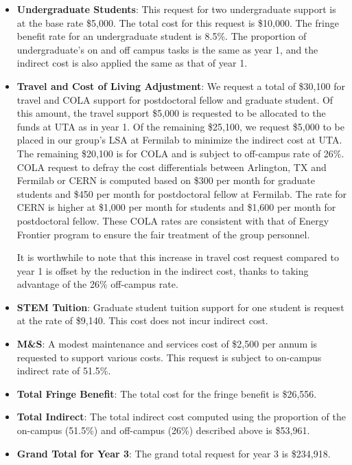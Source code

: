 \begin{enumerate}
\begin{itemize}[noitemsep,nolistsep]
\item {{\bf Undergraduate Students}: This request for two undergraduate support is at the base rate \$5,000.  The total cost for this request is \$10,000.  The fringe benefit rate for an undergraduate student is 8.5\%.  The proportion of undergraduate’s on and off campus tasks is the same as year 1, and the indirect cost is also applied the same as that of year 1.}

\item{{\bf Travel and Cost of Living Adjustment}: We request a total of \$30,100 for travel and COLA support for postdoctoral fellow and graduate student.   Of this amount, the travel support \$5,000 is requested to be allocated to the funds at UTA as in year 1.  Of the remaining \$25,100, we request \$5,000 to be placed in our group’s LSA at Fermilab to minimize the indirect cost at UTA.   The remaining \$20,100 is for COLA and is subject to off-campus rate of 26\%.  COLA request to defray the cost differentials between Arlington, TX and Fermilab or CERN is computed based on \$300 per month for graduate students and \$450 per month for postdoctoral fellow at Fermilab.  The rate for CERN is higher at \$1,000 per month for students and \$1,600 per month for postdoctoral fellow.  These COLA rates are consistent with that of Energy Frontier program to ensure the fair treatment of the group personnel.  

It is worthwhile to note that this increase in travel cost request compared to year 1 is offset by the reduction in the indirect cost, thanks to taking advantage of the 26\% off-campus rate.}

\item {{\bf STEM Tuition}: Graduate student tuition support for one student is request at the rate of \$9,140.  This cost does not incur indirect cost.}

\item {{\bf M\&S}: A modest maintenance and services cost of \$2,500 per annum is requested to support various costs.   This request is subject to on-campus indirect rate of 51.5\%.}

\item {{\bf Total Fringe Benefit}: The total cost for the fringe benefit is \$26,556.}
\item {{\bf Total Indirect}: The total indirect cost computed using the proportion of the on-campus (51.5\%) and off-campus (26\%) described above is \$53,961.}
\item {{\bf Grand Total for Year 3}: The grand total request for year 3 is \$234,918.}

\end{itemize}
\end{enumerate}
